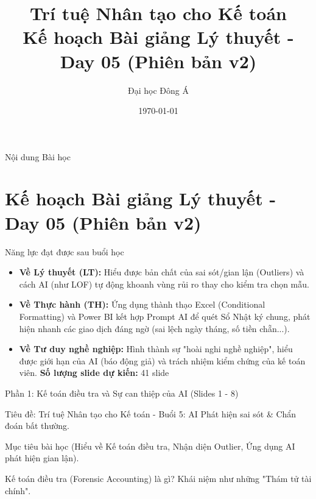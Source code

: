 \documentclass[aspectratio=169]{beamer}
\title[Trí tuệ Nhân tạo cho Kế toán]{Trí tuệ Nhân tạo cho Kế toán \\ \vspace{0.3cm} \Large Kế hoạch Bài giảng Lý thuyết - Day 05 (Phiên bản v2)}
\author{Đại học Đông Á}
\date{\today}
\begin{document}
\begin{frame}
    \titlepage
\end{frame}

\begin{frame}{Nội dung Bài học}
    \tableofcontents
\end{frame}


\section{Kế hoạch Bài giảng Lý thuyết - Day 05 (Phiên bản v2)}


\begin{frame}{Năng lực đạt được sau buổi học}
    \begin{itemize}
        \item \textbf{Về Lý thuyết (LT):} Hiểu được bản chất của sai sót/gian lận (Outliers) và cách AI (như LOF) tự động khoanh vùng rủi ro thay cho kiểm tra chọn mẫu.
        \item \textbf{Về Thực hành (TH):} Ứng dụng thành thạo Excel (Conditional Formatting) và Power BI kết hợp Prompt AI để quét Sổ Nhật ký chung, phát hiện nhanh các giao dịch đáng ngờ (sai lệch ngày tháng, số tiền chẵn...).
        \item \textbf{Về Tư duy nghề nghiệp:} Hình thành sự "hoài nghi nghề nghiệp", hiểu được giới hạn của AI (báo động giả) và trách nhiệm kiểm chứng của kế toán viên.
        \textbf{Số lượng slide dự kiến:} 41 slide
    \end{itemize}
\end{frame}


\begin{frame}{Phần 1: Kế toán điều tra và Sự can thiệp của AI (Slides 1 - 8)}
\end{frame}


\begin{frame}{Tiêu đề: Trí tuệ Nhân tạo cho Kế toán - Buổi 5: AI Phát hiện sai sót \& Chẩn đoán bất thường.}
\end{frame}


\begin{frame}{Mục tiêu bài học (Hiểu về Kế toán điều tra, Nhận diện Outlier, Ứng dụng AI phát hiện gian lận).}
\end{frame}


\begin{frame}{Kế toán điều tra (Forensic Accounting) là gì? Khái niệm như những "Thám tử tài chính".}
\end{frame}
\end{document}
